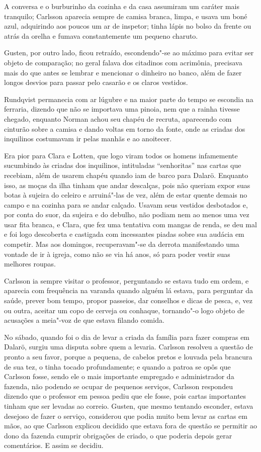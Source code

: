 A conversa e o burburinho da cozinha e da casa assumiram um caráter mais tranquilo;
Carlsson aparecia sempre de camisa branca, limpa, e usava um boné azul,
adquirindo aos poucos um ar de inspetor; tinha lápis no bolso da frente ou atrás
da orelha e fumava constantemente um pequeno charuto.

Gusten, por outro lado, ficou retraído, escondendo"-se ao máximo para evitar ser
objeto de comparação; no geral falava dos citadinos com acrimônia, precisava
mais do que antes se lembrar e mencionar o dinheiro no banco, além de fazer
longos desvios para passar pelo casarão e os claros vestidos.

Rundqvist permanecia com ar lúgubre e na maior parte do tempo se escondia na ferraria,
dizendo que não se importava uma pinoia, nem que a rainha tivesse chegado,
enquanto Norman achou seu chapéu de recruta, aparecendo com cinturão sobre a
camisa e dando voltas em torno da fonte, onde as criadas dos inquilinos
costumavam ir pelas manhãs e ao anoitecer.

Era pior para Clara e Lotten, que logo viram todos os homens infamemente
sucumbindo às criadas dos inquilinos, intituladas ``senhoritas'' nas
cartas que recebiam, além de usarem chapéu quando iam de barco para Dalarö.
Enquanto isso, as moças da ilha tinham que andar descalças, pois não queriam
expor suas botas à sujeira do celeiro e arruiná"-las de vez, além de estar quente
demais no campo e na cozinha para se andar calçado. Usavam seus vestidos
desbotados e, por conta do suor, da sujeira e do debulho, não podiam nem ao menos
uma vez usar fita branca, e Clara, que fez uma tentativa com mangas de
renda, se deu mal e foi logo descoberta e castigada com incessantes piadas sobre
sua audácia em competir. Mas aos domingos, recuperavam"-se da derrota
manifestando uma vontade de ir à igreja, como não se via há anos, só para
poder vestir suas melhores roupas.

Carlsson ia sempre visitar o professor, perguntando se estava tudo em ordem, e
aparecia com frequência na varanda quando alguém lá estava, para perguntar da
saúde, prever bom tempo, propor passeios, dar conselhos e dicas de pesca, e, vez
ou outra, aceitar um copo de cerveja ou conhaque, tornando"-o logo objeto de
acusações a meia"-voz de que estava filando comida.

No sábado, quando foi o dia de levar a criada da família para fazer compras em Dalarö,
surgiu uma disputa sobre quem a levaria. Carlsson resolveu a questão de pronto
a seu favor, porque a pequena, de cabelos pretos e louvada pela brancura de sua
tez, o tinha tocado profundamente; e quando a patroa se opôs que Carlsson fosse,
sendo ele o mais importante empregado e administrador da fazenda, não podendo se
ocupar de pequenos serviços, Carlsson respondeu dizendo que o professor em
pessoa pediu que ele fosse, pois cartas importantes tinham que ser levadas ao
correio. Gusten, que mesmo tentando esconder, estava desejoso de fazer o
serviço, considerou que podia muito bem levar as cartas em mãos, ao que Carlsson
explicou decidido que estava fora de questão se permitir ao dono da fazenda
cumprir obrigações de criado, o que poderia depois gerar comentários. E assim se
decidiu.

